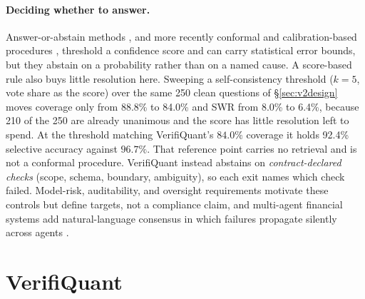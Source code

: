 \documentclass[sigconf,anonymous]{acmart}
\newcommand{\scCovOpen}{88.8\%}      %
\newcommand{\scSWRopen}{8.0\%}       %
\newcommand{\scCovTight}{84.0\%}     %
\newcommand{\scSWRtight}{6.4\%}      %
\newcommand{\scSelAccTight}{92.4\%}  %
\newcommand{\scUnanimous}{210}       %
\begin{document}
\paragraph{Deciding whether to answer.}
Answer-or-abstain methods \cite{elyaniv2010foundations,geifman2017selective}, and more recently conformal and calibration-based procedures \cite{quach2024conformal,kadavath2022language}, threshold a confidence score and can carry statistical error bounds, but they abstain on a probability rather than on a named cause. A score-based rule also buys little resolution here. Sweeping a self-consistency threshold ($k{=}5$, vote share as the score) over the same 250 clean questions of \S\ref{sec:v2design} moves coverage only from \scCovOpen{} to \scCovTight{} and SWR from \scSWRopen{} to \scSWRtight{}, because \scUnanimous{} of the 250 are already unanimous and the score has little resolution left to spend. At the threshold matching VerifiQuant's $84.0\%$ coverage it holds \scSelAccTight{} selective accuracy against $96.7\%$. That reference point carries no retrieval and is not a conformal procedure. VerifiQuant instead abstains on \emph{contract-declared checks} (scope, schema, boundary, ambiguity), so each exit names which check failed. Model-risk, auditability, and oversight requirements \cite{fed2011sr117,euaiact2024,finra2020ai} motivate these controls but define targets, not a compliance claim, and multi-agent financial systems \cite{kundu2025multiagent} add natural-language consensus in which failures propagate silently across agents \cite{cemri2025mas}.

\section{VerifiQuant}\label{sec:v2method}
\end{document}
